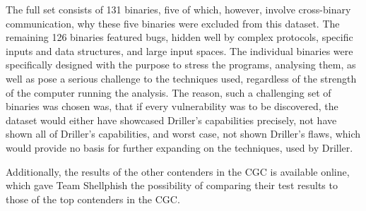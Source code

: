 \documentclass[a4paper]{article}
\begin{document}
The full set consists of 131 binaries, five of which, however, involve cross-binary communication, why these five binaries were excluded from this dataset. The remaining 126 binaries featured bugs, hidden well by complex protocols, specific inputs and data structures, and large input spaces. The individual binaries were specifically designed with the purpose to stress the programs, analysing them, as well as pose a serious challenge to the techniques used, regardless of the strength of the computer running the analysis. The reason, such a challenging set of binaries was chosen was, that if every vulnerability was to be discovered, the dataset would either have showcased Driller's capabilities precisely, not have shown all of Driller's capabilities, and worst case, not shown Driller's flaws, which would provide no basis for further expanding on the techniques, used by Driller. 

Additionally, the results of the other contenders in the CGC is available online, which gave Team Shellphish the possibility of comparing their test results to those of the top contenders in the CGC.
\end{document}
